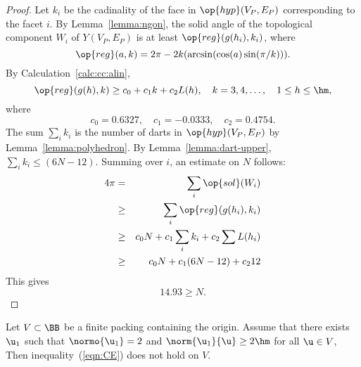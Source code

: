 \begin{proof}
Let $k_i$ be the cadinality of the face in $\op{hyp}(V_P,E_P)$
corresponding to the facet $i$.  By Lemma~\ref{lemma:ngon}, the solid
angle of the topological component $W_i$ of $Y(V_P,E_P)$ is at least
$\op{reg}(g(h_i),k_i)$, where %
%
%
\begin{displaymath} 
\op{reg}(a,k) = 2\pi - 2 k (\arcsin(\cos(a)\sin(\pi/k))).
\end{displaymath}
By Calculation~\ref{calc:cc:alin}, %
\begin{equation}\label{eqn:alin} 
\op{reg}(g(h),k) \ge c_0 + c_1 k + c_2 L(h),\quad
k = 3,4,\ldots,\quad 1\le h\le \hm,
\end{equation}
where
\begin{displaymath}c_0 = 0.6327,\quad c_1 = -0.0333,\quad c_2 =
0.4754.\end{displaymath} The sum $\sum_i k_i$ is the number of darts
in $\op{hyp}(V_P,E_P)$ by  Lemma~\ref{lemma:polyhedron}.  By
Lemma~\ref{lemma:dart-upper}, $\sum_i k_i \le (6N-12)$.  Summing over
$i$, an estimate on $N$ follows: 
%
%
\begin{eqnarray*} 
4\pi &=& \sum_i\op{sol}(W_i)\\
&\ge& \sum_i \op{reg}(g(h_i),k_i) \\
&\ge& c_0 N +c_1\sum_i k_i + c_2 \sum L(h_i)\\
&\ge& c_0 N +c_1 (6N-12) + c_2 12\\
\end{eqnarray*}
This gives
\begin{displaymath} 
14.93 \ge N.
\end{displaymath}
\end{proof} 


\begin{lemma}[]\label{300}\label{lemma:D'}  
Let $ V\subset\BB$ be a finite packing containing the origin.
Assume that there exists $ \u_1$ such that $\normo{ \u_1}=2$ and
$\norm{ \u_1}{ \u}\ge 2\hm$ for all $\u\in V$,
Then  inequality~(\ref{eqn:CE}) does not hold on $ V$.
\end{lemma}

